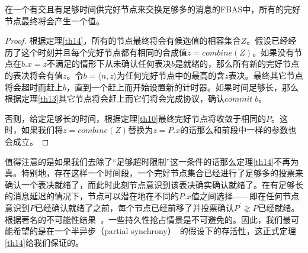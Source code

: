 \begin{theorem}\label{th14}
        在一个有{\quorum}交且有足够时间供完好节点来交换足够多的消息的FBAS中，所有的完好节点最终将会产生一个值。
\end{theorem}

\begin{proof}
        根据定理\ref{th14}，所有的节点最终将会有候选值的相容集合$Z$。假设已经经历了这个时刻并且每个完好节点都有相同的合成值$z=combine(Z)$。如果没有节点在$b.x=z$不满足的情形下从未确认任何表决$b$是就绪的，那么所有新的完好节点的表决将会有值$z$。令$b=\langle n,z\rangle$为任何完好节点中的最高的含$z$表决。最终其它节点将会超时而赶上$b$，直到一个{\quorum}赶上而开始设置新的计时器。如果时间足够长，那么根据定理\ref{th13}其它节点将会赶上而它们将会完成协议，确认$commit\;b$。
        
        否则，给定足够长的时间，根据定理\ref{th10}最终完好节点将收敛于相同的$P$。这时，如果我们将$z=combine(Z)$替换为$z=P.x$的话那么和前段中一样的参数也会成立。
\end{proof}

值得注意的是如果我们去除了``足够超时限制''这一条件的话那么定理\ref{th14}不再为真。特别地，存在这样一个时间段，一个完好节点集合已经进行了足够多的投票来确认一个表决就绪了，而此时此刻节点意识到该表决确实确认就绪了。在有足够长的消息延迟的情况下，节点可以潜在地在不同的$P.x$值之间选择——即在任何节点意识到$P$已经确认就绪了之前，每个节点已经前移了并投票确认$P^{\prime}\gnsim P$已经就绪。根据著名的不可能性结果~\cite{Fischer:1985:IDC:3149.214121}，一些持久性抢占情景是不可避免的。因此，我们最可能希望的是在一个半异步（partial synchrony）~\cite{Dwork:1988:CPP:42282.42283}的假设下的存活性，这正式定理\ref{th14}给我们保证的。